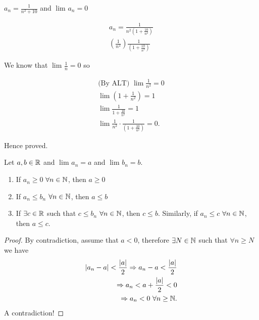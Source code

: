 
\begin{eg}
	$a_n = \frac{1}{n^{2} + 10}$ and $\lim_{} a_n = 0$ 
\end{eg}

\begin{align}
	a_n = \frac{1}{n^{2} \left( 1 + \frac{10}{n^{2}} \right) } \\
	\left( \frac{1}{n^{2}} \right) \frac{1}{\left( 1 + \frac{10}{n^{2}} \right) }
\end{align}

We know that $\lim_{} \frac{1}{n} = 0$ so

\begin{align}
	\text{(By ALT) } \lim_{} \frac{1}{n^{2}} = 0 \\
	\lim_{} \left( 1 + \frac{1}{n^{2}} \right) = 1 \\
	\lim_{} \frac{1}{1+\frac{10}{n^{2}}} = 1\\
	\lim_{} \frac{1}{n^{2}} \cdot \frac{1}{\left( 1 + \frac{10}{n^{2}} \right) }= 0.
\end{align}

Hence proved.

\begin{theorem}
	Let $a,b \in \mathbb{R}$ and $\lim_{} a_n = a$ and $\lim_{} b_n = b$.
	\begin{enumerate}
		\item If $a_n \ge 0$ $\forall n \in \mathbb{N}$, then $a \ge 0$ 
		\item If $a_n \le b_n$ $\forall n \in \mathbb{N}$, then $a \le b$ 
		\item If $\exists c \in \mathbb{R}$ such that $c \le b_n$ $\forall n \in \mathbb{N}$, then $c \le b$. Similarly, if $a_n \le c$ $\forall n \in \mathbb{N}$, then $a \le c$.
	\end{enumerate}
\end{theorem}

\begin{proof}
	By contradiction, assume that $a < 0 $, therefore $\exists N \in \mathbb{N}$ such that $\forall n \ge  N$ we have 
	\begin{align}
		\left|a_n - a\right| < \frac{\left|a\right|}{2} \Rightarrow a_n - a < \frac{\left|a\right|}{2} \\
		\Rightarrow a_n < a + \frac{\left|a\right|}{2} < 0 \\
		\Rightarrow a_n < 0 \text{ } \forall n \ge \mathbb{N}.
	\end{align}
	A contradiction!
\end{proof}














